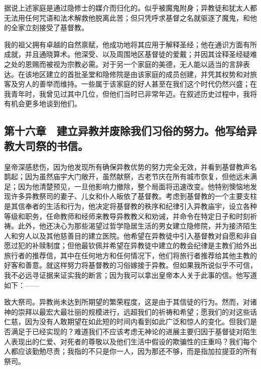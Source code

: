 据说上述家庭是通过隐修士的媒介而归化的。似乎被魔鬼附身；异教徒和犹太人都无法用任何咒语和法术解救他脱离此苦；但只凭呼求基督之名就驱逐了魔鬼，和他的全家立刻接受了基督教。\par

我的祖父拥有卓越的自然禀赋，他成功地将其应用于解释圣经；他在通识方面有所成就，并且通晓算术。他深受、以及周围地区基督徒的爱戴；并因其诠释圣经疑难之处的恩赐而被视为宗教必需。对于另一个家庭的美德，无人能以适当的言辞表达。在该地区建立的首批圣堂和隐修院是由该家庭的成员创建，并凭其权势和对旅客及穷人的善举而维持。一些属于该家庭的好人甚至在我们这个时代仍然兴盛；在我青年时，我曾见过其中几位，但他们当时已非常年迈。在叙述历史过程中，我将有机会更多地谈到他们。\par


\subsection{第十六章　建立异教并废除我们习俗的努力。他写给异教大司祭的书信。}

皇帝深感悲伤，因为他发现所有确保异教优势的努力完全无效，并看到基督教声名鹊起；因为虽然庙宇大门敞开，虽然献祭，古老节庆在所有城市恢复，但他远未满足；因为他清楚预见，一旦他影响力撤除，整个局面将迅速改变。他特别懊恼地发现许多异教祭司的妻子、儿女和仆人皈依了基督教。考虑到基督教的一个主要支柱是其信奉者的生活和行为，他决定将基督教的秩序和纪律引入异教庙宇，设立各种等级和职务，任命教师和经师来教导异教教义和劝诫，并命令在特定日子和时刻祈祷。此外，他还决心为那些渴望过哲学隐居生活的男女建立隐修院，并为接济陌生人和穷人以及其他慈善目的建立医院。他希望在异教徒中引入基督教对自愿和非自愿过犯的补赎制度；但他最钦佩并希望在异教徒中建立的教会纪律是主教们给外出旅行者的推荐信，其中在任何地方和任何情况下，他们将旅行者推荐给其他主教的好客和善意。就这样努力将基督教的习俗嫁接于异教。但如果我所说似乎不可信，我不必远寻证据来证实我的断言；因为我可以拿出皇帝本人关于此事的信。他写道如下：——\par

致大祭司。异教尚未达到所期望的繁荣程度，这是由于其信徒的行为。然而，对诸神的崇拜以最宏大最壮丽的规模进行，远超我们的祈祷和希望；愿我们的对这些话仁慈，因为没有人敢期望在如此短的时间内看到如此广泛和惊人的变化。但我们是否满足于已经实现的？难道我们不应该考虑无神论的进展主要归因于基督徒对陌生人表现出的仁爱、对死者的尊敬以及他们生活中假设的欺骗性的庄重吗？我们每个人都应该勤勉尽责；我指的不只是你一人，因为那还不够，而是指加拉提亚的所有祭司。\par

